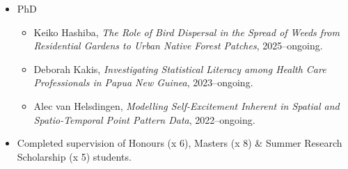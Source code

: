 \documentclass[10pt,a4paper]{moderncv}
\begin{document}
\begin{itemize}
\item PhD
  \begin{itemize}
  \item Keiko Hashiba, \textit{The Role of Bird Dispersal in the Spread of Weeds from Residential Gardens to Urban Native Forest Patches}, 2025--ongoing.
  \item Deborah Kakis, \textit{Investigating Statistical Literacy among Health Care Professionals in Papua New Guinea}, 2023--ongoing.
  \item Alec van Helsdingen, \textit{Modelling Self-Excitement Inherent in Spatial and Spatio-Temporal Point Pattern Data}, 2022--ongoing.
  \end{itemize}
\item Completed supervision of Honours (x 6), Masters (x 8) \& Summer Research Scholarship (x 5) students.

\end{itemize}
\end{document}
